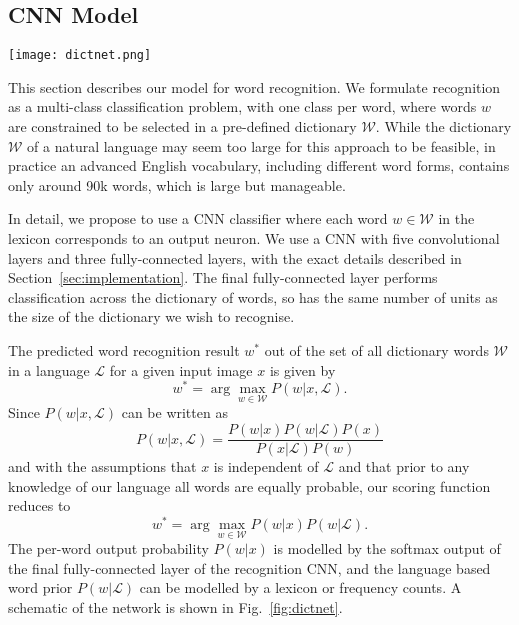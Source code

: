 \documentclass[twocolumn]{svjour3}          \smartqed  \usepackage{epsfig}
\begin{document}
\subsection{CNN Model}
\label{sec:model}

\begin{figure*}[t]
\centering
\texttt{[image: dictnet.png]}
\caption{A schematic of the CNN used for text recognition by word classification. The dimensions of the featuremaps at each layer of the network are shown.}
\label{fig:dictnet}
\end{figure*}

\newcommand{\dict}{\mathcal{W}}
This section describes our model for word recognition. We formulate recognition as a multi-class classification problem, with one class per word, where words $w$ are constrained to be selected in a pre-defined dictionary $\dict$. While the dictionary $\dict$ of a natural language may seem too large for this approach to be feasible, in practice an advanced English vocabulary, including different word forms, contains only around 90k words, which is large but manageable.

In detail, we propose to use a CNN classifier where each word $w\in\dict$ in the lexicon corresponds to an output neuron. We use a CNN with five convolutional layers and three fully-connected layers, with the exact details described in Section~\ref{sec:implementation}. The final fully-connected layer performs classification across the dictionary of words, so has the same number of units as the size of the dictionary we wish to recognise. 

The predicted word recognition result $w^*$ out of the set of all dictionary words $\dict$ in a language $\mathcal{L}$ for a given input image $x$ is given by 
\begin{equation}
w^* = \arg\max_{w \in \dict} P(w|x,\mathcal{L}). 
\label{eqn:word}
\end{equation}
Since $P(w|x,\mathcal{L})$ can be written as
\begin{equation}
P(w|x,\mathcal{L}) = \frac{P(w|x)P(w|\mathcal{L})P(x)}{P(x|\mathcal{L})P(w)}
\end{equation}
and with the assumptions that $x$ is independent of $\mathcal{L}$ and that prior to any knowledge of our language all words are equally probable, our scoring function reduces to 
\begin{equation}
w^* = \arg\max_{w \in \dict} P(w|x)P(w|\mathcal{L}).
\end{equation}
The per-word output probability $P(w|x)$ is modelled by the softmax output of the final fully-connected layer of the recognition CNN, and the language based word prior $P(w|\mathcal{L})$ can be modelled by a lexicon or frequency counts. A schematic of the network is shown in Fig.~\ref{fig:dictnet}.
\end{document}
